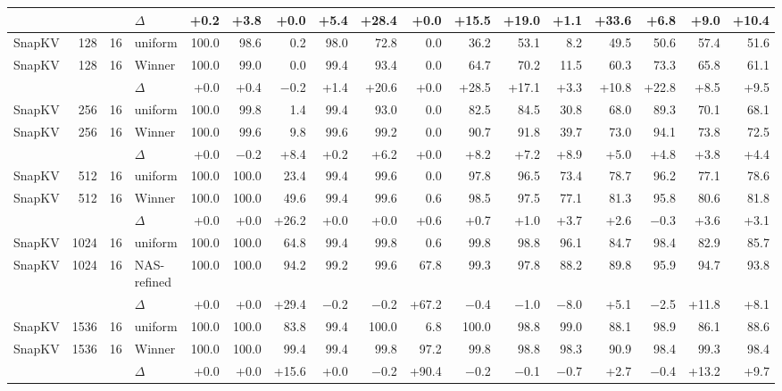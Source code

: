 \begin{table}[t]
\begin{tabular}{@{}l r r l r r r r r r r r r r r r r @{}}
     &  &  & $\Delta$ & +0.2 & +3.8 & +0.0 & +5.4 & +28.4 & +0.0 & +15.5 & +19.0 & +1.1 & +33.6 & +6.8 & +9.0 & +10.4 \\
    \midrule
    SnapKV & 128 & 16 & uniform & 100.0 & 98.6 & 0.2 & 98.0 & 72.8 & 0.0 & 36.2 & 53.1 & 8.2 & 49.5 & 50.6 & 57.4 & 51.6 \\
    SnapKV & 128 & 16 & Winner & 100.0 & 99.0 & 0.0 & 99.4 & 93.4 & 0.0 & 64.7 & 70.2 & 11.5 & 60.3 & 73.3 & 65.8 & 61.1 \\
     &  &  & $\Delta$ & +0.0 & +0.4 & $-$0.2 & +1.4 & +20.6 & +0.0 & +28.5 & +17.1 & +3.3 & +10.8 & +22.8 & +8.5 & +9.5 \\
    \midrule
    SnapKV & 256 & 16 & uniform & 100.0 & 99.8 & 1.4 & 99.4 & 93.0 & 0.0 & 82.5 & 84.5 & 30.8 & 68.0 & 89.3 & 70.1 & 68.1 \\
    SnapKV & 256 & 16 & Winner & 100.0 & 99.6 & 9.8 & 99.6 & 99.2 & 0.0 & 90.7 & 91.8 & 39.7 & 73.0 & 94.1 & 73.8 & 72.5 \\
     &  &  & $\Delta$ & +0.0 & $-$0.2 & +8.4 & +0.2 & +6.2 & +0.0 & +8.2 & +7.2 & +8.9 & +5.0 & +4.8 & +3.8 & +4.4 \\
    \midrule
    SnapKV & 512 & 16 & uniform & 100.0 & 100.0 & 23.4 & 99.4 & 99.6 & 0.0 & 97.8 & 96.5 & 73.4 & 78.7 & 96.2 & 77.1 & 78.6 \\
    SnapKV & 512 & 16 & Winner & 100.0 & 100.0 & 49.6 & 99.4 & 99.6 & 0.6 & 98.5 & 97.5 & 77.1 & 81.3 & 95.8 & 80.6 & 81.8 \\
     &  &  & $\Delta$ & +0.0 & +0.0 & +26.2 & +0.0 & +0.0 & +0.6 & +0.7 & +1.0 & +3.7 & +2.6 & $-$0.3 & +3.6 & +3.1 \\
    \midrule
    SnapKV & 1024 & 16 & uniform & 100.0 & 100.0 & 64.8 & 99.4 & 99.8 & 0.6 & 99.8 & 98.8 & 96.1 & 84.7 & 98.4 & 82.9 & 85.7 \\
    SnapKV & 1024 & 16 & NAS-refined & 100.0 & 100.0 & 94.2 & 99.2 & 99.6 & 67.8 & 99.3 & 97.8 & 88.2 & 89.8 & 95.9 & 94.7 & 93.8 \\
     &  &  & $\Delta$ & +0.0 & +0.0 & +29.4 & $-$0.2 & $-$0.2 & +67.2 & $-$0.4 & $-$1.0 & $-$8.0 & +5.1 & $-$2.5 & +11.8 & +8.1 \\
    \midrule
    SnapKV & 1536 & 16 & uniform & 100.0 & 100.0 & 83.8 & 99.4 & 100.0 & 6.8 & 100.0 & 98.8 & 99.0 & 88.1 & 98.9 & 86.1 & 88.6 \\
    SnapKV & 1536 & 16 & Winner & 100.0 & 100.0 & 99.4 & 99.4 & 99.8 & 97.2 & 99.8 & 98.8 & 98.3 & 90.9 & 98.4 & 99.3 & 98.4 \\
     &  &  & $\Delta$ & +0.0 & +0.0 & +15.6 & +0.0 & $-$0.2 & +90.4 & $-$0.2 & $-$0.1 & $-$0.7 & +2.7 & $-$0.4 & +13.2 & +9.7 \\

\end{tabular}
\end{table}
